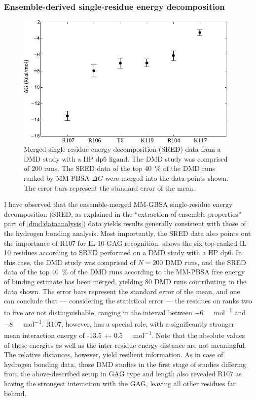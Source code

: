 \subsubsection{Ensemble-derived single-residue energy decomposition}

\begin{figure}
\centering
\includegraphics[width=0.97\textwidth]{gfx/dmdil10/round1_il10_SRED_hpdp6.pdf}
\caption[]{Merged single-residue energy decomposition (SRED) data from a
DMD study with a HP dp6 ligand. The DMD study was comprised of 200 runs. The
SRED data of the top \SI{40}{\percent} of the DMD runs ranked by MM-PBSA
$\Delta G$ were merged into the data points shown. The error bars represent the
standard error of the mean.}
\label{fig:dmdil10:SRED_hpdp6}
\end{figure}

I have observed that the ensemble-merged MM-GBSA single-residue energy
decomposition (SRED, as explained in the \enquote{extraction of ensemble
properties} part of \cref{dmd:dataanalysis}) data yields results generally
consistent with those of the hydrogen bonding analysis. Most importantly, the
SRED data also points out the importance of R107 for IL-10-GAG recognition.
 shows the six top-ranked IL-10 residues according
to SRED performed on a DMD study with a HP dp6. In this case, the DMD study was
comprised of $N=200$ DMD runs, and the SRED data of the top \SI{40}{\percent} of
the DMD runs according to the MM-PBSA free energy of binding estimate has been
merged, yielding 80 DMD runs contributing to the data shown. The error bars
represent the standard error of the mean, and one can conclude that ---
considering the statistical error --- the residues on ranks two to five are not
distinguishable, ranging in the interval between \SI{-6}{\kilo\calory\per\mol}
and \SI{-8}{\kilo\calory\per\mol}. R107, however, has a special role, with a
significantly stronger mean interaction energy of \SI{-13.5 +-
0.5}{\kilo\calory\per\mol}. Note that the absolute values of these energies as
well as the inter-residue energy distance are not meaningful. The relative
distances, however, yield resilient information. As in case of hydrogen bonding
data, those DMD studies in the first stage of studies differing from the
above-described setup in GAG type and length also revealed R107 as having the
strongest interaction with the GAG, leaving all other residues far behind.

